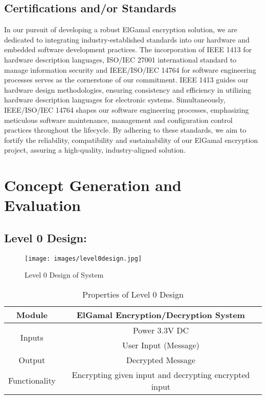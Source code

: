 \documentclass[12pt]{article}
\begin{document}
	\subsection{Certifications and/or Standards}
	In our pursuit of developing a robust ElGamal encryption solution, we are dedicated to integrating industry-established standards into our hardware and embedded software development practices. The incorporation of IEEE 1413 for hardware description languages, ISO/IEC 27001 international standard to manage information security and IEEE/ISO/IEC 14764 for software engineering processes serves as the cornerstone of our commitment. IEEE 1413 guides our hardware design methodologies, ensuring consistency and efficiency in utilizing hardware description languages for electronic systems. Simultaneously, IEEE/ISO/IEC 14764 shapes our software engineering processes, emphasizing meticulous software maintenance, management and configuration control practices throughout the lifecycle. By adhering to these standards, we aim to fortify the reliability, compatibility and sustainability of our ElGamal encryption project, assuring a high-quality, industry-aligned solution.
	\section{Concept Generation and Evaluation}
	
	\subsection{Level 0 Design:}
	\begin{figure}[H]
		\centering
		\label{Level 0 Design of System }
		\texttt{[image: images/level0design.jpg]}\\[0.5 cm]	
		\caption{Level 0 Design of System } 		
	\end{figure}
	\begin{table}[H]
		\centering
		
		\label{Properties Of Level 0 Design }
		\begin{tabular}{|c|c|}
			\hline
			Module & ElGamal Encryption/Decryption System \\ \hline
			\multirow{2}{*}{Inputs} & Power 3.3V DC \\ \cline{2-2}
			& User Input (Message) \\ \hline
			Output & Decrypted Message \\ \hline
			Functionality & Encrypting given input and  decrypting encrypted input \\ \hline
		
		\end{tabular}
		\caption{Properties of Level 0 Design }
	\end{table}
	
\end{document}
